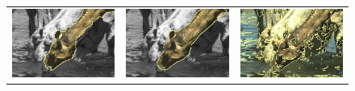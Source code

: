 \documentclass[runningheads]{llncs}
\begin{document}
\begin{figure}
\begin{tabular}{ccc}
		\includegraphics[scale=0.2]{images/segmentation/bc/camel/gc-seg.png} &
		\includegraphics[scale=0.2]{images/segmentation/bc/camel/corrected-seg.png} &
		\includegraphics[scale=0.2]{images/segmentation/schoenemann/camel/camel-seg.png}\\		

\end{tabular}
\end{figure}
\end{document}
